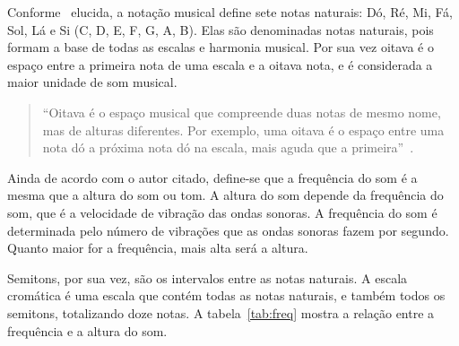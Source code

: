 \documentclass{sbrt}
\begin{document}
Conforme~\cite{moretti2003prototipo} elucida, a notação musical define sete notas naturais: Dó, Ré, Mi, Fá, Sol, Lá e Si
(C, D, E, F, G, A, B). Elas são denominadas notas naturais, pois formam a base de todas as escalas e harmonia musical.
Por sua vez oitava é o espaço entre a primeira nota de uma escala e a oitava nota, e é considerada a maior unidade de
som musical.

\begin{quote}
  ``Oitava é o espaço musical que compreende duas notas de mesmo nome, mas de alturas diferentes. Por exemplo, uma
  oitava é o espaço entre uma nota dó a próxima nota dó na escala, mais aguda que a
  primeira''~\cite{moretti2003prototipo}.
\end{quote}

Ainda de acordo com o autor citado, define-se que a frequência do som é a mesma que a altura do som ou tom. A altura do
som depende da frequência do som, que é a velocidade de vibração das ondas sonoras. A frequência do som é determinada
pelo número de vibrações que as ondas sonoras fazem por segundo. Quanto maior for a frequência, mais alta será a altura.

Semitons, por sua vez, são os intervalos entre as notas naturais. A escala cromática é uma escala que contém todas as
notas naturais, e também todos os semitons, totalizando doze notas. A tabela~\ref{tab:freq} mostra a relação entre a
frequência e a altura do som.
\end{document}
